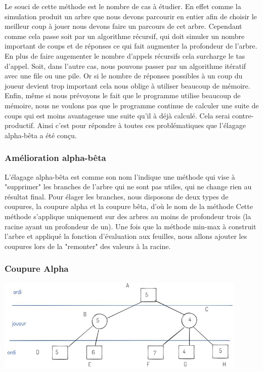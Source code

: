\documentclass[a4paper, 12pt, french]{article}
\begin{document}
	Le souci de cette méthode est le nombre de cas à étudier. En effet comme la simulation
	produit un arbre que nous devons parcourir en entier afin de choisir le meilleur coup à jouer
	nous devons faire un parcours de cet arbre. Cependant comme cela passe soit par un algorithme récursif,
	qui doit simuler un nombre important de coups et de réponses ce qui fait augmenter la profondeur de l'arbre.
	En plus de faire augementer le nombre d'appels récursifs cela surcharge le tas d'appel. Soit, dans l'autre cas,
	nous pouvons passer par un algorithme itératif avec une file ou une pile. Or si le nombre de réponses possibles
	à un coup du joueur devient trop important cela nous oblige à utiliser beaucoup de mémoire. Enfin, même si nous
	prévoyons le fait que le programme utilise beaucoup de mémoire, nous ne voulons pas que le programme continue de
	calculer une suite de coups qui est moins avantageuse une suite qu'il à déjà calculé. Cela serai contre-productif.
	Ainsi c'est pour répondre à toutes ces problématiques que l'élagage alpha-bêta a été conçu.

	\subsubsection{Amélioration alpha-bêta}
	L'élagage alpha-bêta est comme son nom l'indique une méthode qui vise à "supprimer" les branches de l'arbre qui
	ne sont pas utiles, qui ne change rien au résultat final. Pour élager les branches, nous disposons de deux types de
	coupures, la coupure alpha et la coupure bêta, d'où le nom de la méthode\cite{elagage_alpha_beta}
	Cette méthode s'applique uniquement sur des arbres au moins de profondeur trois
	(la racine ayant un profondeur de un). Une fois que la méthode min-max à construit l'arbre
	et appliqué la fonction d'évaluation aux feuilles, nous allons ajouter les coupures lors de la
	"remonter" des valeurs à la racine.

	\subsubsection{Coupure Alpha}
	\includegraphics[width=12cm]{images/elagageAlpha.JPG}
\end{document}

